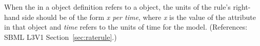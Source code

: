 When the  in a \RateRule object definition refers to a
\Parameter object, the units of the rule's right-hand side should be of the form
\emph{x per time}, where \emph{x} is the value of the 
attribute in that \Parameter object and \emph{time} refers to the units of
time for the model.  (References: SBML L3V1 Section~\ref{sec:raterule}.)
